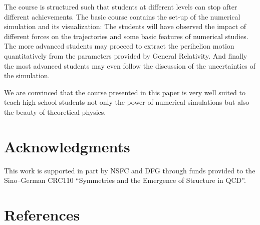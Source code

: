 \documentclass[12pt,ngerman,american]{iopart}
\begin{document}
The course is structured such that students at different levels can stop after different achievements. The basic
course contains the set-up of the numerical simulation and its visualization: The students will have observed
the impact of different forces on the trajectories and some basic features of numerical studies.
The more advanced students may proceed to extract the perihelion motion quantitatively from the
parameters provided by General Relativity. And finally the most advanced students may even follow the
discussion of the uncertainties of the simulation.

We are convinced that the course presented in this paper is very well suited to teach high school students not
only the power of numerical simulations but also the beauty of theoretical physics.


\section*{Acknowledgments}

This work is supported in part by NSFC and DFG through funds provided to the
Sino--German CRC110 ``Symmetries and the Emergence of Structure in QCD''.



\appendix
\section*{References}



\clearpage
\end{document}
